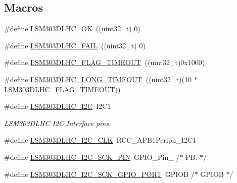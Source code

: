 \subsection*{Macros}
\begin{DoxyCompactItemize}
\item 
\#define \hyperlink{group__STM32F3__DISCOVERY__LSM303DLHC__Exported__Constants_ga970d7be4111f5020a597bca50b5f569a}{L\+S\+M303\+D\+L\+H\+C\+\_\+\+O\+K}~((uint32\+\_\+t) 0)
\item 
\#define \hyperlink{group__STM32F3__DISCOVERY__LSM303DLHC__Exported__Constants_ga8cd0a52fd044c7b4c4a6dd55b31509ee}{L\+S\+M303\+D\+L\+H\+C\+\_\+\+F\+A\+I\+L}~((uint32\+\_\+t) 0)
\item 
\#define \hyperlink{group__STM32F3__DISCOVERY__LSM303DLHC__Exported__Constants_gaeca6f0de35d3c5bbf39d82fc98e02b2f}{L\+S\+M303\+D\+L\+H\+C\+\_\+\+F\+L\+A\+G\+\_\+\+T\+I\+M\+E\+O\+U\+T}~((uint32\+\_\+t)0x1000)
\item 
\#define \hyperlink{group__STM32F3__DISCOVERY__LSM303DLHC__Exported__Constants_ga0adfd3800bf8afe7875dedf186889024}{L\+S\+M303\+D\+L\+H\+C\+\_\+\+L\+O\+N\+G\+\_\+\+T\+I\+M\+E\+O\+U\+T}~((uint32\+\_\+t)(10 $\ast$ \hyperlink{group__STM32F3__DISCOVERY__LSM303DLHC__Exported__Constants_gaeca6f0de35d3c5bbf39d82fc98e02b2f}{L\+S\+M303\+D\+L\+H\+C\+\_\+\+F\+L\+A\+G\+\_\+\+T\+I\+M\+E\+O\+U\+T}))
\item 
\#define \hyperlink{group__STM32F3__DISCOVERY__LSM303DLHC__Exported__Constants_gaf5f6301222a9e6cda020bb8e19347096}{L\+S\+M303\+D\+L\+H\+C\+\_\+\+I2\+C}~I2\+C1
\begin{DoxyCompactList}\small\item\em L\+S\+M303\+D\+L\+H\+C I2\+C Interface pins. \end{DoxyCompactList}\item 
\#define \hyperlink{group__STM32F3__DISCOVERY__LSM303DLHC__Exported__Constants_gaf5c5ab473bfe06adb9464d26b3207a27}{L\+S\+M303\+D\+L\+H\+C\+\_\+\+I2\+C\+\_\+\+C\+L\+K}~R\+C\+C\+\_\+\+A\+P\+B1\+Periph\+\_\+\+I2\+C1
\item 
\#define \hyperlink{group__STM32F3__DISCOVERY__LSM303DLHC__Exported__Constants_gae8a147124ad05b5b58997eb7ab1082d8}{L\+S\+M303\+D\+L\+H\+C\+\_\+\+I2\+C\+\_\+\+S\+C\+K\+\_\+\+P\+I\+N}~G\+P\+I\+O\+\_\+\+Pin\+\_                  /$\ast$ P\+B. $\ast$/
\item 
\#define \hyperlink{group__STM32F3__DISCOVERY__LSM303DLHC__Exported__Constants_ga0211c58363a329a873f81bac0ccef25a}{L\+S\+M303\+D\+L\+H\+C\+\_\+\+I2\+C\+\_\+\+S\+C\+K\+\_\+\+G\+P\+I\+O\+\_\+\+P\+O\+R\+T}~G\+P\+I\+O\+B                       /$\ast$ G\+P\+I\+O\+B $\ast$/

\end{DoxyCompactItemize}
